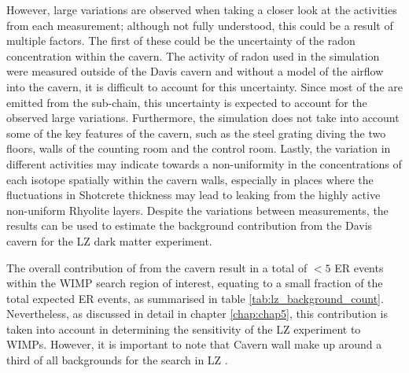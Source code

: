 

However, large variations are observed when taking a closer look at the activities from each measurement; although not fully understood, this could be a result of multiple factors. The first of these could be the uncertainty of the radon concentration within the cavern. The activity of radon used in the simulation were measured outside of the Davis cavern and without a model of the airflow into the cavern, it is difficult to account for this uncertainty. Since most of the \grays{} are emitted from the \RnTTT{} sub-chain, this uncertainty is expected to account for the observed large variations. Furthermore, the simulation does not take into account some of the key features of the cavern, such as the steel grating diving the two floors, walls of the counting room and the control room. Lastly, the variation in different activities may indicate towards a non-uniformity in the concentrations of each isotope spatially within the cavern walls, especially in places where the fluctuations in Shotcrete thickness may lead to \grays{} leaking from the highly active non-uniform Rhyolite layers. Despite the variations between measurements, the results can be used to estimate the background contribution from the Davis cavern for the LZ dark matter experiment.

The overall contribution of \grays{} from the cavern result in a total of $<5$ ER events within the WIMP search region of interest, equating to a small fraction of the total expected ER events, as summarised in table \ref{tab:lz_background_count}. Nevertheless, as discussed in detail in chapter \ref{chap:chap5}, this contribution is taken into account in determining the sensitivity of the LZ experiment to WIMPs. However, it is important to note that Cavern wall \grays{} make up around a third of all backgrounds for the \neutrinolessDoubleBeta{} search in LZ \cite{Akerib_2020_double_beta}.

